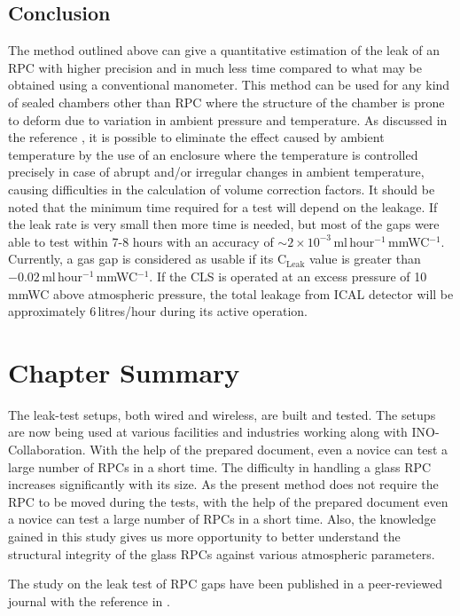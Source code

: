 \subsection{Conclusion}
The method outlined above can give a quantitative estimation of the leak of an RPC with higher precision and in much less time compared to what may be obtained using a conventional manometer. This method can be used for any kind of sealed chambers other than RPC where the structure of the chamber is prone to deform due to variation in ambient pressure and temperature. As discussed in the reference \cite{rpcleak2016}, it is possible to eliminate the effect caused by ambient temperature by the use of an enclosure where the temperature is controlled precisely in case of abrupt and/or irregular changes in ambient temperature, causing difficulties in the calculation of volume correction factors. It should be noted that the minimum time required for a test will depend on the leakage. If the leak rate is very small then more time is needed, but most of the gaps were able to test within 7-8 hours with an accuracy of $\sim 2\times 10^{-3}$\,ml\,hour$^{-1}$\,mmWC$^{-1}$. Currently, a gas gap is considered as usable if its $\textrm{C}_{\textrm{Leak}}$ value is greater than $-0.02$\,ml\,hour$^{-1}$\,mmWC$^{-1}$. If the CLS is operated at an excess pressure of 10\,mmWC above atmospheric pressure, the total leakage from ICAL detector will be approximately 6\,litres/hour during its active operation.

\section{Chapter Summary}
The leak-test setups, both wired and wireless, are built and tested.
The setups are now being used at various facilities and industries
working along with INO-Collaboration. With the help of the prepared
document, even a novice can test a large number of RPCs in a short
time. The difficulty in handling a glass RPC increases significantly
with its size. As the present method does not require the RPC to be
moved during the tests, with the help of the prepared document even
a novice can test a large number of RPCs in a short time. Also, the
knowledge gained in this study gives us more opportunity to better
understand the structural integrity of the glass RPCs against various
atmospheric parameters.

The study on the leak test of RPC gaps have been published in a
peer-reviewed journal with the reference in \cite{rpcleak}.
